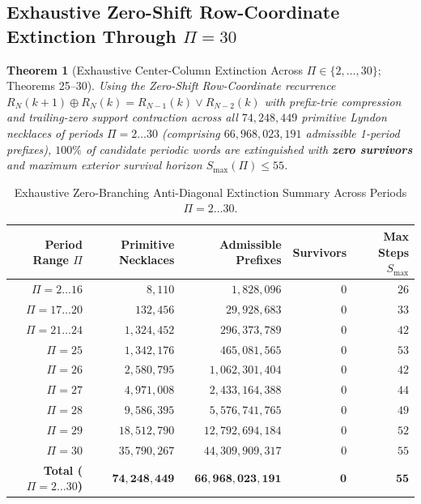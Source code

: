 \documentclass[11pt,a4paper]{article}
\newtheorem{theorem}{Theorem}[section]
\theoremstyle{definition}
\theoremstyle{remark}
\begin{document}
\subsection{Exhaustive Zero-Shift Row-Coordinate Extinction Through \texorpdfstring{$\Pi = 30$}{Pi = 30}}

\begin{theorem}[Exhaustive Center-Column Extinction Across $\Pi \in \{2,\dots,30\}$; Theorems 25--30]\label{thm:pi30}
Using the Zero-Shift Row-Coordinate recurrence $R_N(k+1) \oplus R_N(k) = R_{N-1}(k) \lor R_{N-2}(k)$ with prefix-trie compression and trailing-zero support contraction across all $74{,}248{,}449$ primitive Lyndon necklaces of periods $\Pi = 2 \dots 30$ (comprising $66{,}968{,}023{,}191$ admissible 1-period prefixes), $100\%$ of candidate periodic words are extinguished with \textbf{zero survivors} and maximum exterior survival horizon $S_{\max}(\Pi) \le 55$.
\end{theorem}

\begin{table}[htbp]
\centering
\caption{Exhaustive Zero-Branching Anti-Diagonal Extinction Summary Across Periods $\Pi = 2 \dots 30$.}
\label{tab:pi30}
\footnotesize
\setlength{\tabcolsep}{7pt}
\begin{tabular}{@{}rrrrr@{}}
\toprule
\textbf{Period Range $\Pi$} & \textbf{Primitive Necklaces} & \textbf{Admissible Prefixes} & \textbf{Survivors} & \textbf{Max Steps $S_{\max}$} \\
\midrule
$\Pi = 2 \dots 16$  & $8{,}110$        & $1{,}828{,}096$         & $0$ & $26$ \\
$\Pi = 17 \dots 20$ & $132{,}456$      & $29{,}928{,}683$        & $0$ & $33$ \\
$\Pi = 21 \dots 24$ & $1{,}324{,}452$  & $296{,}373{,}789$       & $0$ & $42$ \\
$\Pi = 25$          & $1{,}342{,}176$  & $465{,}081{,}565$       & $0$ & $53$ \\
$\Pi = 26$          & $2{,}580{,}795$  & $1{,}062{,}301{,}404$   & $0$ & $42$ \\
$\Pi = 27$          & $4{,}971{,}008$  & $2{,}433{,}164{,}388$   & $0$ & $44$ \\
$\Pi = 28$          & $9{,}586{,}395$  & $5{,}576{,}741{,}765$   & $0$ & $49$ \\
$\Pi = 29$          & $18{,}512{,}790$ & $12{,}792{,}694{,}184$  & $0$ & $52$ \\
$\Pi = 30$          & $35{,}790{,}267$ & $44{,}309{,}909{,}317$  & $0$ & $55$ \\
\midrule
\textbf{Total ($\Pi = 2 \dots 30$)} & $\mathbf{74{,}248{,}449}$ & $\mathbf{66{,}968{,}023{,}191}$ & $\mathbf{0}$ & $\mathbf{55}$ \\
\bottomrule
\end{tabular}
\end{table}
\end{document}
